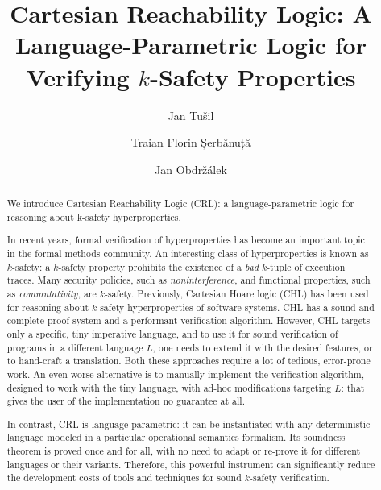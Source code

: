 \documentclass{easychair}
\title{Cartesian Reachability Logic: A Language-Parametric Logic for Verifying $k$-Safety Properties}
\author{
  Jan Tu\v{s}il \inst{1}
  \and Traian Florin Șerbănuță  \inst{2}
  \and Jan Obdržálek \inst{1}
}
\institute{
  Masaryk University,
  Brno, Czech Republic\\
  \email{jan.tusil@mail.muni.cz,obdrzalek@fi.muni.cz}
\and
   University of Bucharest,
   Bucharest, Romania\\
   \email{traian.serbanuta@unibuc.ro}\\
 }
\begin{document}
\maketitle


\begin{abstract}
  We introduce Cartesian Reachability Logic (CRL):
  a language-parametric logic for reasoning about k-safety hyperproperties.

  In recent years, formal verification of hyperproperties has become an important topic
  in the formal methods community.
  An interesting class of hyperproperties is known as $k$-safety:
  a $k$-safety property prohibits the existence of a \emph{bad} $k$-tuple of execution traces.
  Many security policies, such as \emph{noninterference}, 
  and functional properties, such as \emph{commutativity}, are $k$-safety.
  Previously, Cartesian Hoare logic (CHL) has been used for reasoning about $k$-safety hyperproperties
  of software systems.
  CHL has a sound and complete proof system and a performant verification algorithm.
  However, CHL targets only a specific, tiny imperative language, and to use it for sound verification
  of programs in a different language $L$, one needs to extend it with the desired features,
  or to hand-craft a translation.
  Both these approaches require a lot of tedious, error-prone work.
  An even worse alternative is to manually implement the verification algorithm,
  designed to work with the tiny language, with ad-hoc modifications targeting $L$:
  that gives the user of the implementation no guarantee at all.

  In contrast, CRL is language-parametric: it can be instantiated with any deterministic language
  modeled in a particular operational semantics formalism.
  Its soundness theorem is proved once and for all, with no need to adapt or re-prove it
  for different languages or their variants.
  Therefore, this powerful instrument can significantly reduce the development costs of tools and techniques
  for sound $k$-safety verification.
\end{abstract}

  
\end{document}
